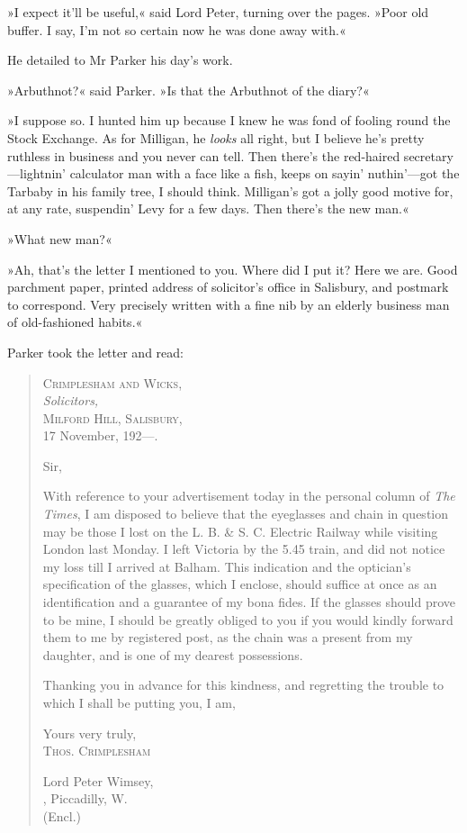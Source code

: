 »I expect it'll be useful,« said Lord Peter, turning over the pages. »Poor old buffer. I say, I'm not so certain now he was done away with.«

He detailed to Mr Parker his day's work.

»Arbuthnot?« said Parker. »Is that the Arbuthnot of the diary?«

»I suppose so. I hunted him up because I knew he was fond of fooling round the Stock Exchange. As for Milligan, he \textit{looks} all right, but I believe he's pretty ruthless in business and you never can tell. Then there's the red-haired secretary—lightnin' calculator man with a face like a fish, keeps on sayin' nuthin'---got the Tarbaby in his family tree, I should think. Milligan's got a jolly good motive for, at any rate, suspendin' Levy for a few days. Then there's the new man.«

»What new man?«

»Ah, that's the letter I mentioned to you. Where did I put it? Here we are. Good parchment paper, printed address of solicitor's office in Salisbury, and postmark to correspond. Very precisely written with a fine nib by an elderly business man of old-fashioned habits.«

Parker took the letter and read:
\begin{quotation}
\begin{flushright}
\hfill
\begin{minipage}{0.6\linewidth}
\textsc{Crimplesham and Wicks,}\\
\vin \textit{Solicitors,}\\
\textsc{Milford Hill, Salisbury,}\\
17 November, 192---.
\end{minipage}
\end{flushright}

\noindent Sir,

With reference to your advertisement today in the personal column of \textit{The Times}, I am disposed to believe that the eyeglasses and chain in question may be those I lost on the L. B. \& S. C. Electric Railway while visiting London last Monday. I left Victoria by the 5.45 train, and did not notice my loss till I arrived at Balham. This indication and the optician's specification of the glasses, which I enclose, should suffice at once as an identification and a guarantee of my bona fides. If the glasses should prove to be mine, I should be greatly obliged to you if you would kindly forward them to me by registered post, as the chain was a present from my daughter, and is one of my dearest possessions.

Thanking you in advance for this kindness, and regretting the trouble to which I shall be putting you, I am,

\begin{flushright}
Yours very truly,\\
\textsc{Thos. Crimplesham}\\
\end{flushright}

\noindent Lord Peter Wimsey,\\
, Piccadilly, W.\\
\noindent (Encl.)
\end{quotation}

